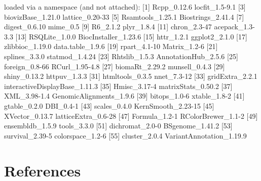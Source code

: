 \documentclass[12pt]{report}
\renewenvironment{Schunk}{\vspace{0pt}}{\vspace{0pt}}
\begin{document}
\begin{Schunk}
\begin{Soutput}
loaded via a namespace (and not attached):
 [1] Rcpp_0.12.6                   locfit_1.5-9.1               
 [3] biovizBase_1.21.0             lattice_0.20-33              
 [5] Rsamtools_1.25.1              Biostrings_2.41.4            
 [7] digest_0.6.10                 mime_0.5                     
 [9] R6_2.1.2                      plyr_1.8.4                   
[11] chron_2.3-47                  acepack_1.3-3.3              
[13] RSQLite_1.0.0                 BiocInstaller_1.23.6         
[15] httr_1.2.1                    ggplot2_2.1.0                
[17] zlibbioc_1.19.0               data.table_1.9.6             
[19] rpart_4.1-10                  Matrix_1.2-6                 
[21] splines_3.3.0                 statmod_1.4.24               
[23] Rhtslib_1.5.3                 AnnotationHub_2.5.6          
[25] foreign_0.8-66                RCurl_1.95-4.8               
[27] biomaRt_2.29.2                munsell_0.4.3                
[29] shiny_0.13.2                  httpuv_1.3.3                 
[31] htmltools_0.3.5               nnet_7.3-12                  
[33] gridExtra_2.2.1               interactiveDisplayBase_1.11.3
[35] Hmisc_3.17-4                  matrixStats_0.50.2           
[37] XML_3.98-1.4                  GenomicAlignments_1.9.6      
[39] bitops_1.0-6                  xtable_1.8-2                 
[41] gtable_0.2.0                  DBI_0.4-1                    
[43] scales_0.4.0                  KernSmooth_2.23-15           
[45] XVector_0.13.7                latticeExtra_0.6-28          
[47] Formula_1.2-1                 RColorBrewer_1.1-2           
[49] ensembldb_1.5.9               tools_3.3.0                  
[51] dichromat_2.0-0               BSgenome_1.41.2              
[53] survival_2.39-5               colorspace_1.2-6             
[55] cluster_2.0.4                 VariantAnnotation_1.19.9     
\end{Soutput}
\end{Schunk}

\section{References}



\end{document}
